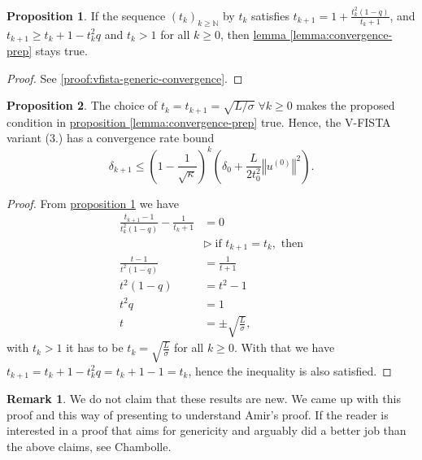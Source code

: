 \documentclass[]{article}
\theoremstyle{definition}
\newtheorem{prop}{Proposition}[section]  %
\newtheorem{remark}{Remark}[subsection]
{
    \newtheorem{assumption}{Assumption}
}
\numberwithin{equation}{subsection}
\begin{document}
        \begin{prop}\label{prop:vfista-generic-convergence}
            If the sequence $(t_k)_{k \ge \mathbb N}$ by $t_{k}$ satisfies 
            $t_{k + 1} = 1 + \frac{t_k^2(1 - q)}{t_k + 1}$, and $t_{k + 1} \ge t_k + 1 - t_k^2q$ and $t_k > 1$ for all $k\ge 0$, then \hyperref[lemma:convergence-prep]{lemma \ref*{lemma:convergence-prep}} stays true. 
        \end{prop}
        \begin{proof}
            See \hyperref[proof:vfista-generic-convergence]{\ref*{proof:vfista-generic-convergence}}. 
        \end{proof}
        \begin{prop}\label{prop:vfista-linear-convergence}
            The choice of $t_k = t_{k + 1} = \sqrt{L/\sigma}\; \forall k\ge 0$ makes the proposed condition in \hyperref[lemma:convergence-prep]{proposition \ref*{lemma:convergence-prep}} true. 
            Hence, the V-FISTA variant (3.) has a convergence rate bound 
            \[
                \delta_{k + 1}
                \le 
                \left(
                    1 - \frac{1}{\sqrt{\kappa}}
                \right)^k\left(
                    \delta_0 + \frac{L}{2t_0^2}\left\Vert
                        u^{(0)}
                    \right\Vert^2
                \right).     
            \]
        \end{prop}
        \begin{proof}
            From \hyperref[prop:vfista-generic-convergence]{proposition \ref*{prop:vfista-generic-convergence}} we have 
            \begin{align*}
                \frac{t_{k + 1} - 1}{t^2_k(1 - q)}
                    -
                \frac{1}{t_k + 1} &= 0
                \\
                & \triangleright\; \text{if } t_{k + 1} = t_k, \text{ then}
                \\
                \frac{t - 1}{t^2(1 - q)} &= \frac{1}{t + 1}
                \\
                t^2(1 - q) 
                &= t^2 - 1
                \\
                t^2q &= 1
                \\
                t &= \pm \sqrt{\frac{L}{\sigma}}, 
            \end{align*}
            with $t_k > 1$ it has to be $t_k = \sqrt{\frac{L}{\sigma}}$ for all $k \ge 0$. 
            With that we have $t_{k + 1} = t_{k} + 1 - t_k^2 q = t_k + 1 - 1 = t_k$, hence the inequality is also satisfied. 
        \end{proof}
        \begin{remark}
            We do not claim that these results are new. 
            We came up with this proof and this way of presenting to understand Amir's proof\cite[10.7.7]{beck_first-order_nodate}. 
            If the reader is interested in a proof that aims for genericity and arguably did a better job than the above claims, see Chambolle\cite[Appendix B]{chambolle_introduction_2016}. 
        \end{remark}
        
\end{document}
